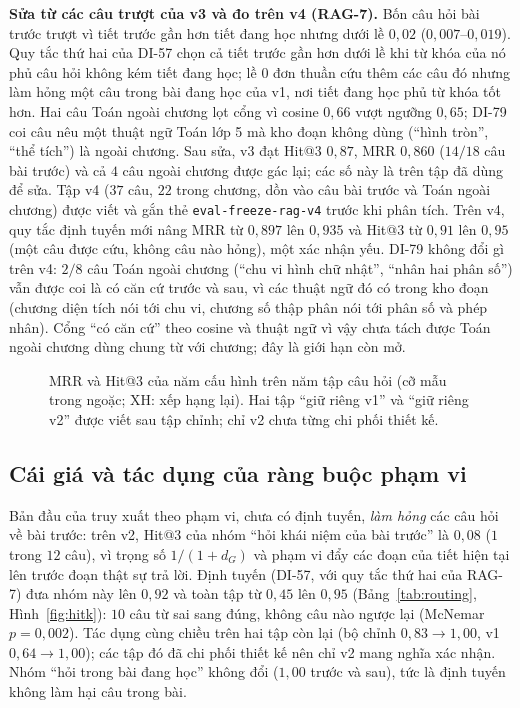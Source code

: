 \textbf{Sửa từ các câu trượt của v3 và đo trên v4 (RAG-7).} Bốn câu hỏi bài trước trượt vì tiết trước gần hơn tiết đang học nhưng dưới lề $0{,}02$ ($0{,}007$--$0{,}019$). Quy tắc thứ hai của DI-57 chọn cả tiết trước gần hơn dưới lề khi từ khóa của nó phủ câu hỏi không kém tiết đang học; lề $0$ đơn thuần cứu thêm các câu đó nhưng làm hỏng một câu trong bài đang học của v1, nơi tiết đang học phủ từ khóa tốt hơn. Hai câu Toán ngoài chương lọt cổng vì cosine $0{,}66$ vượt ngưỡng $0{,}65$; DI-79 coi câu nêu một thuật ngữ Toán lớp 5 mà kho đoạn không dùng (``hình tròn'', ``thể tích'') là ngoài chương. Sau sửa, v3 đạt Hit@3 $0{,}87$, MRR $0{,}860$ ($14/18$ câu bài trước) và cả $4$ câu ngoài chương được gác lại; các số này là trên tập đã dùng để sửa. Tập v4 ($37$ câu, $22$ trong chương, dồn vào câu bài trước và Toán ngoài chương) được viết và gắn thẻ \texttt{eval-freeze-rag-v4} trước khi phân tích. Trên v4, quy tắc định tuyến mới nâng MRR từ $0{,}897$ lên $0{,}935$ và Hit@3 từ $0{,}91$ lên $0{,}95$ (một câu được cứu, không câu nào hỏng), một xác nhận yếu. DI-79 không đổi gì trên v4: $2/8$ câu Toán ngoài chương (``chu vi hình chữ nhật'', ``nhân hai phân số'') vẫn được coi là có căn cứ trước và sau, vì các thuật ngữ đó có trong kho đoạn (chương diện tích nói tới chu vi, chương số thập phân nói tới phân số và phép nhân). Cổng ``có căn cứ'' theo cosine và thuật ngữ vì vậy chưa tách được Toán ngoài chương dùng chung từ với chương; đây là giới hạn còn mở.

\begin{figure}[tp]
\centering

\caption{MRR và Hit@3 của năm cấu hình trên năm tập câu hỏi (cỡ mẫu trong ngoặc; XH: xếp hạng lại). Hai tập ``giữ riêng v1'' và ``giữ riêng v2'' được viết sau tập chỉnh; chỉ v2 chưa từng chi phối thiết kế.}
\label{fig:ablation}
\end{figure}

\subsection{Cái giá và tác dụng của ràng buộc phạm vi}\label{sec:routing-res}
Bản đầu của truy xuất theo phạm vi, chưa có định tuyến, \emph{làm hỏng} các câu hỏi về bài trước: trên v2, Hit@3 của nhóm ``hỏi khái niệm của bài trước'' là $0{,}08$ ($1$ trong $12$ câu), vì trọng số $1/(1+d_G)$ và phạm vi đẩy các đoạn của tiết hiện tại lên trước đoạn thật sự trả lời. Định tuyến (DI-57, với quy tắc thứ hai của RAG-7) đưa nhóm này lên $0{,}92$ và toàn tập từ $0{,}45$ lên $0{,}95$ (Bảng~\ref{tab:routing}, Hình~\ref{fig:hitk}): $10$ câu từ sai sang đúng, không câu nào ngược lại (McNemar $p=0{,}002$). Tác dụng cùng chiều trên hai tập còn lại (bộ chỉnh $0{,}83\to1{,}00$, v1 $0{,}64\to1{,}00$); các tập đó đã chi phối thiết kế nên chỉ v2 mang nghĩa xác nhận. Nhóm ``hỏi trong bài đang học'' không đổi ($1{,}00$ trước và sau), tức là định tuyến không làm hại câu trong bài.

